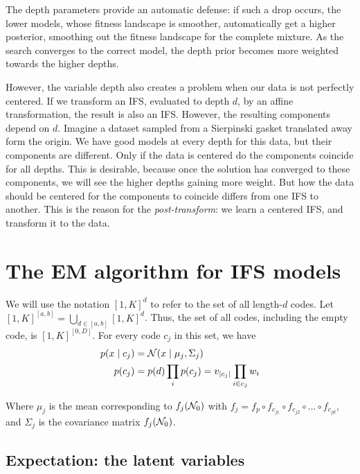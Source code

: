 The depth parameters provide an automatic defense: if such a drop occurs, the lower models, whose fitness landscape is smoother, automatically get a higher posterior, smoothing out the fitness landscape for the complete mixture. As the search converges to the correct model, the depth prior becomes more weighted towards the higher depths.

However, the variable depth also creates a problem when our data is not perfectly centered. If we transform an IFS, evaluated to depth $d$, by an affine transformation, the result is also an IFS. However, the resulting components depend on $d$. Imagine a dataset sampled from a Sierpinski gasket translated away form the origin. We have good models at every depth for this data, but their components are different. Only if the data is centered do the components coincide for all depths. This is desirable, because once the solution has converged to these components, we will see the higher depths gaining more weight. But how the data should be centered for the components to coincide differs from one IFS to another. This is the reason for the \emph{post-transform}: we learn a centered IFS, and transform it to the data.   


\section{The EM algorithm for IFS models}

We will use the notation $[1,K]^d$ to refer to the set of all length-$d$ codes. Let $[1,K]^{[a,b]} = \bigcup_{d \in [a,b]} [1,K]^d$. Thus, the set of all codes, including the empty code, is $[1, K]^{[0, D]}$. For every code $c_j$ in this set, we have 
\begin{align*} 
p(x \mid c_j) &= {\cal N}(x \mid \mu_j, \Sigma_j) \\
p(c_j) &= p(d) \prod_i p(c_j) = v_{|c_j|}\prod_{i \in c_j} w_{i}
\end{align*}

Where $\mu_j$ is the mean corresponding to $f_j({\cal N}_0)$ with $f_j = f_p \circ f_{c_{j1}} \circ f_{c_{j2}} \circ \ldots \circ f_{c_{jd}}$, and $\Sigma_j$ is the covariance matrix $f_j({\cal N}_0)$.

\subsection{Expectation: the latent variables}

